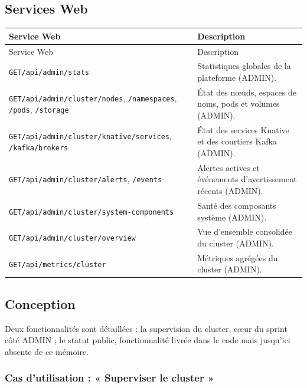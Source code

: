 \subsection{Services Web}
{\setlength{\tabcolsep}{8pt}
\begin{longtable}{|p{5.8cm}|p{8.4cm}|}
\hline
Service Web & Description \\
\hline
\endfirsthead
\hline
Service Web & Description \\
\hline
\endhead
\endfoot
\hline
\endlastfoot
\texttt{GET\slash api\slash admin\slash stats} & Statistiques globales de la plateforme (ADMIN). \\ \hline
\texttt{GET\slash api\slash admin\slash cluster\slash nodes}, \texttt{\slash namespaces}, \texttt{\slash pods}, \texttt{\slash storage} & État des nœuds, espaces de noms, pods et volumes (ADMIN). \\ \hline
\texttt{GET\slash api\slash admin\slash cluster\slash knative\slash services}, \texttt{\slash kafka\slash brokers} & État des services Knative et des courtiers Kafka (ADMIN). \\ \hline
\texttt{GET\slash api\slash admin\slash cluster\slash alerts}, \texttt{\slash events} & Alertes actives et événements d'avertissement récents (ADMIN). \\ \hline
\texttt{GET\slash api\slash admin\slash cluster\slash system-components} & Santé des composants système (ADMIN). \\ \hline
\texttt{GET\slash api\slash admin\slash cluster\slash overview} & Vue d'ensemble consolidée du cluster (ADMIN). \\ \hline
\texttt{GET\slash api\slash metrics\slash cluster} & Métriques agrégées du cluster (ADMIN). \\ \hline
\end{longtable}}

\subsection{Conception}

Deux fonctionnalités sont détaillées : la supervision du cluster, cœur du sprint côté ADMIN ; le statut public, fonctionnalité livrée dans le code mais jusqu'ici absente de ce mémoire.

\needspace{0.45\textheight}
\subsubsection{Cas d'utilisation : « Superviser le cluster »}

